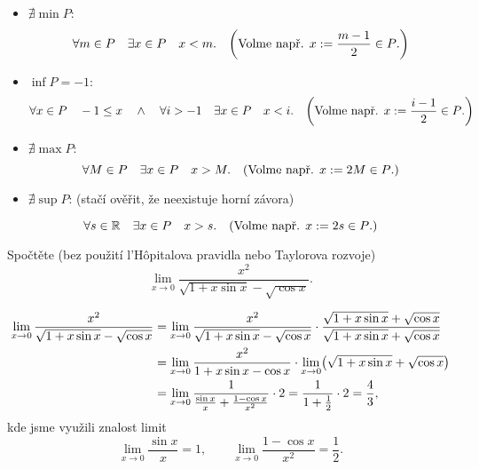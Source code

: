 \documentclass[answers]{exam}
\begin{document}
\begin{questions}
\begin{solution}
    \begin{itemize}
      \item $\nexists \min P$:
      \begin{equation*}
        \forall m \in P \quad \exists x \in P \quad x < m. \quad \parens{\text{Volme např. $x := \frac{m - 1}{2} \in P$.}}
      \end{equation*}
      \item $\inf P = -1$:
      \begin{equation*}
        \forall x \in P \quad -1 \le x \quad \wedge \quad \forall i > -1 \quad \exists x \in P \quad x < i. \quad \parens{\text{Volme např. $x := \frac{i - 1}{2} \in P$.}}
      \end{equation*}
      \item $\nexists \max P$:
      \begin{equation*}
        \forall M \in P \quad \exists x \in P \quad x > M. \quad \parens{\text{Volme např. $x := 2 M \in P$.}}
      \end{equation*}
      \item $\nexists \sup P$: (stačí ověřit, že neexistuje horní závora)
    \end{itemize}
      \begin{equation*}
        \forall s \in \R \quad \exists x \in P \quad x > s. \quad \parens{\text{Volme např. $x := 2 s \in P$.}}
      \end{equation*}        
  \end{solution}
  
  \question[2] Spočtěte (bez použití l'Hôpitalova pravidla nebo Taylorova rozvoje)
  \begin{equation*}
    \lim_{x \to 0} \frac{x^2}{\sqrt{1 + x \sin x} - \sqrt{\cos x}}.
  \end{equation*}
  
  \begin{solution}
  \begin{align*}
    \lim_{x \to 0} \frac{x^2}{\sqrt{1 + x \sin x} - \sqrt{\cos x}}
    &=
    \lim_{x \to 0} \frac{x^2}{\sqrt{1 + x \sin x} - \sqrt{\cos x}} \cdot \frac{\sqrt{1 + x \sin x} + \sqrt{\cos x}}{\sqrt{1 + x \sin x} + \sqrt{\cos x}}
    \\
    &=
    \lim_{x \to 0} \frac{x^2}{1 + x \sin x - \cos x} \cdot \lim_{x \to 0} \parens{\sqrt{1 + x \sin x} + \sqrt{\cos x}}
    \\
    &=
    \lim_{x \to 0} \frac{1}{\frac{\sin x}{x} + \frac{1 - \cos x}{x^2}} \cdot 2
    =
    \frac{1}{1+\frac{1}{2}} \cdot 2 = \frac{4}{3},
  \end{align*}
  kde jsme využili znalost limit
  \begin{equation*}
    \lim_{x \to 0} \frac{\sin x}{x} = 1, \qquad \lim_{x \to 0} \frac{1 - \cos x}{x^2} = \frac{1}{2}.
  \end{equation*}
  \end{solution}
  

\end{questions}
\end{document}
